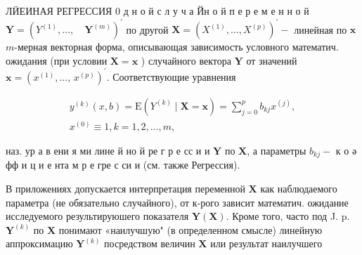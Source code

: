 \documentclass[10pt]{article}
\begin{document}
ЛӤЕИНАЯ РЕГРЕССИЯ 0 д н о й с л у ч а Йн о й п е р е м е н н о й $\boldsymbol{Y}=\left(Y^{(1)}, \ldots, \quad \boldsymbol{Y}^{(m)}\right)^{\prime}$ по другой $\boldsymbol{X}=\left(X^{(1)}, \ldots, X^{(p)}\right)^{\prime}-$ линейная по $\boldsymbol{x}$ $m$-мерная векторная форма, описывающая зависимость условного математич. ожидания (при условии $\boldsymbol{X}=\boldsymbol{x}$ ) случайного вектора $\boldsymbol{Y}$ от значений $\boldsymbol{x}=\left(x^{(1)}, \ldots\right.$, $\left.x^{(p)}\right)^{\prime}$. Соответствующие уравнения



\[

\begin{gathered}

y^{(k)}(x, b)=\mathrm{E}\left(Y^{(k)} \mid \boldsymbol{X}=\boldsymbol{x}\right)=\sum_{j=0}^{p} b_{k j} x^{(j)}, \\

x^{(0)} \equiv 1, k=1,2, \ldots, m,

\end{gathered}

\]



наз. ур а в ени я ми лине й но й ре г р е сс и и $\boldsymbol{Y}$ по $\boldsymbol{X}$, а параметры $b_{k j}-$ к о ә фф и ц и е нта м р е гре с си и (см. также Регрессия).



В приложениях допускается интерпретация переменной $\boldsymbol{X}$ как наблюдаемого параметра (не обязательно случайного), от к-рого зависит математич. ожидание исследуемого результируюшего показателя $\boldsymbol{Y}(\boldsymbol{X})$. Кроме того, часто под J. p. $\boldsymbol{Y}^{(k)}$ по $\boldsymbol{X}$ понимают «наилучшую" (в определенном смысле) линейную аппроксимацию $\boldsymbol{Y}^{(k)}$ посредством величин $\boldsymbol{X}$ или результат наилучшего
\end{document}
